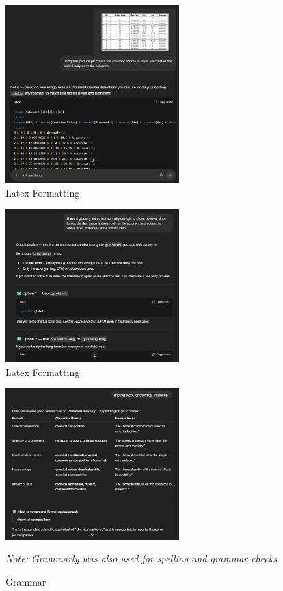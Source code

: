 \begin{figure}[H]
    \centering
    \includegraphics[width=0.6\textwidth]{figures/AI_Usage/latex_pic.png}
    \caption{Latex Formatting}
\end{figure}

\begin{figure}[H]
    \centering
    \includegraphics[width=0.6\textwidth]{figures/AI_Usage/latex_gls.png}
    \caption{Latex Formatting}
\end{figure}

\begin{figure}[H]
    \centering
    \includegraphics[width=0.6\textwidth]{figures/AI_Usage/grammar1.png}
    \caption{Grammar}
    \textit{Note: Grammarly was also used for spelling and grammar checks}
\end{figure}

